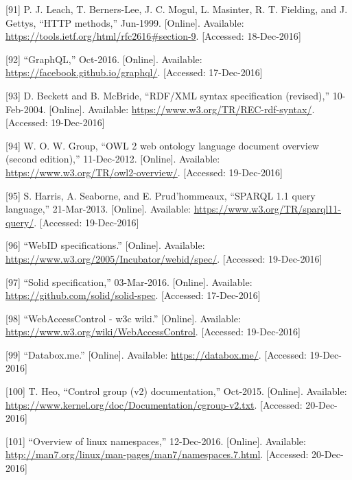 \documentclass[12pt,english,a4paper,titlepage,cleardoublepage=empty,dottedtoc]{report}
\begin{document}
\hypertarget{ref-web_spec_http-methods}{}
{[}91{]} P. J. Leach, T. Berners-Lee, J. C. Mogul, L. Masinter, R. T.
Fielding, and J. Gettys, ``HTTP methods,'' Jun-1999. {[}Online{]}.
Available: \url{https://tools.ietf.org/html/rfc2616\#section-9}.
{[}Accessed: 18-Dec-2016{]}

\hypertarget{ref-web_spec_graphql}{}
{[}92{]} ``GraphQL,'' Oct-2016. {[}Online{]}. Available:
\url{https://facebook.github.io/graphql/}. {[}Accessed: 17-Dec-2016{]}

\hypertarget{ref-web_w3c-tr_rdf}{}
{[}93{]} D. Beckett and B. McBride, ``RDF/XML syntax specification
(revised),'' 10-Feb-2004. {[}Online{]}. Available:
\url{https://www.w3.org/TR/REC-rdf-syntax/}. {[}Accessed: 19-Dec-2016{]}

\hypertarget{ref-web_w3c-tr_owl}{}
{[}94{]} W. O. W. Group, ``OWL 2 web ontology language document overview
(second edition),'' 11-Dec-2012. {[}Online{]}. Available:
\url{https://www.w3.org/TR/owl2-overview/}. {[}Accessed: 19-Dec-2016{]}

\hypertarget{ref-web_w3c-tr_sparql}{}
{[}95{]} S. Harris, A. Seaborne, and E. Prud'hommeaux, ``SPARQL 1.1
query language,'' 21-Mar-2013. {[}Online{]}. Available:
\url{https://www.w3.org/TR/sparql11-query/}. {[}Accessed: 19-Dec-2016{]}

\hypertarget{ref-web_w3c-draft_webid}{}
{[}96{]} ``WebID specifications.'' {[}Online{]}. Available:
\url{https://www.w3.org/2005/Incubator/webid/spec/}. {[}Accessed:
19-Dec-2016{]}

\hypertarget{ref-web_spec_solid}{}
{[}97{]} ``Solid specification,'' 03-Mar-2016. {[}Online{]}. Available:
\url{https://github.com/solid/solid-spec}. {[}Accessed: 17-Dec-2016{]}

\hypertarget{ref-web_2016_wiki_webaccesscontrol}{}
{[}98{]} ``WebAccessControl - w3c wiki.'' {[}Online{]}. Available:
\url{https://www.w3.org/wiki/WebAccessControl}. {[}Accessed:
19-Dec-2016{]}

\hypertarget{ref-web_2016_demo_databox}{}
{[}99{]} ``Databox.me.'' {[}Online{]}. Available:
\url{https://databox.me/}. {[}Accessed: 19-Dec-2016{]}

\hypertarget{ref-web_2015_cgroup-doc}{}
{[}100{]} T. Heo, ``Control group (v2) documentation,'' Oct-2015.
{[}Online{]}. Available:
\url{https://www.kernel.org/doc/Documentation/cgroup-v2.txt}.
{[}Accessed: 20-Dec-2016{]}

\hypertarget{ref-web_2016_kernel-namespace}{}
{[}101{]} ``Overview of linux namespaces,'' 12-Dec-2016. {[}Online{]}.
Available: \url{http://man7.org/linux/man-pages/man7/namespaces.7.html}.
{[}Accessed: 20-Dec-2016{]}
\end{document}
